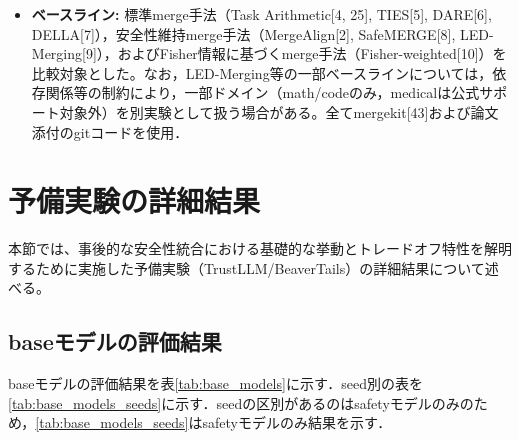 \begin{itemize}
    \begin{itemize}
        \item merge種類:
        \texttt{safety+math},
        \texttt{safety+code},
        \texttt{safety+medical}の2model merge，および多重ドメインmerge\texttt{safety+code+math+medical}。
        \item 比較条件（Pareto優先）:
        安全性評価と有用性評価のPareto Frontier上で支配されない最適・典型設定（$\alpha=0.6$等）および軌跡全体の二通りで比較。ハイパーパラメータ調整を伴わないベースライン（SafeMERGE, MergeAlign等）は既定設定（$\alpha=\mathrm{N/A}$）で評価。
    \end{itemize}
    \item \textbf{ベースライン:}
    標準merge手法（Task Arithmetic[4, 25], TIES[5], DARE[6], DELLA[7]），安全性維持merge手法（MergeAlign[2], SafeMERGE[8], LED-Merging[9]），およびFisher情報に基づくmerge手法（Fisher-weighted[10]）を比較対象とした。なお，LED-Merging等の一部ベースラインについては，依存関係等の制約により，一部ドメイン（math/codeのみ，medicalは公式サポート対象外）を別実験として扱う場合がある。全てmergekit[43]および論文添付のgitコードを使用．
\end{itemize}


\section{予備実験の詳細結果}
\label{app:preliminary_results}
本節では、事後的な安全性統合における基礎的な挙動とトレードオフ特性を解明するために実施した予備実験（TrustLLM/BeaverTails）の詳細結果について述べる。

\subsection{baseモデルの評価結果}

baseモデルの評価結果を表\ref{tab:base_models}に示す．seed別の表を\ref{tab:base_models_seeds}に示す．seedの区別があるのはsafetyモデルのみのため，\ref{tab:base_models_seeds}はsafetyモデルのみ結果を示す．

